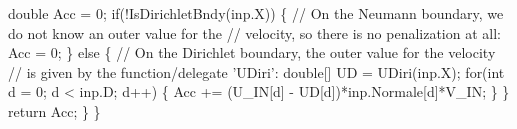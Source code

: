 {\btab \btab double Acc = 0;\newline 
 \newline 
\btab \btab if(!IsDirichletBndy(inp.X)) \{\newline 
\btab \btab \btab // On the Neumann boundary, we do not know an outer value for the\newline 
\btab \btab \btab // velocity, so there is no penalization at all:\newline 
\btab \btab \btab Acc = 0;    \newline 
\btab \btab \} else \{\newline 
\btab \btab \btab // On the Dirichlet boundary, the outer value for the velocity\newline 
\btab \btab \btab // is given by the function/delegate 'UDiri':\newline 
\btab \btab \btab double[] UD = UDiri(inp.X);\newline 
\btab \btab \btab for(int d = 0; d < inp.D; d++) \{\newline 
\btab \btab \btab \btab Acc += (U\_IN[d] - UD[d])*inp.Normale[d]*V\_IN;\newline 
\btab \btab \btab \}\newline 
\btab \btab \}\newline 
\btab \btab return Acc;\newline 
\btab \}\newline 
\}
 }
\BoSSSexe
